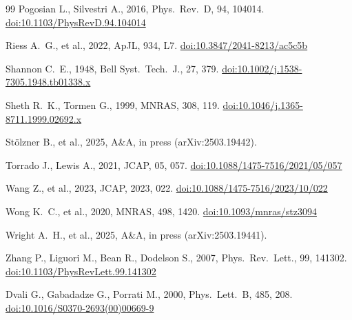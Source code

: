 \documentclass[12pt,a4paper]{article}
\newcommand{\doi}[1]{\href{https://doi.org/#1}{doi:#1}}
\begin{document}
\begin{thebibliography}{99}
Pogosian L., Silvestri A., 2016, Phys.\ Rev.\ D, 94, 104014.
\newblock \doi{10.1103/PhysRevD.94.104014}

Riess A.~G., et al., 2022, ApJL, 934, L7.
\newblock \doi{10.3847/2041-8213/ac5c5b}

Shannon C.~E., 1948, Bell Syst.\ Tech.\ J., 27, 379.
\newblock \doi{10.1002/j.1538-7305.1948.tb01338.x}

Sheth R.~K., Tormen G., 1999, MNRAS, 308, 119.
\newblock \doi{10.1046/j.1365-8711.1999.02692.x}

St\"olzner B., et al., 2025, A\&A, in press (arXiv:2503.19442).

Torrado J., Lewis A., 2021, JCAP, 05, 057.
\newblock \doi{10.1088/1475-7516/2021/05/057}

Wang Z., et al., 2023, JCAP, 2023, 022.
\newblock \doi{10.1088/1475-7516/2023/10/022}

Wong K.~C., et al., 2020, MNRAS, 498, 1420.
\newblock \doi{10.1093/mnras/stz3094}

Wright A.~H., et al., 2025, A\&A, in press (arXiv:2503.19441).

Zhang P., Liguori M., Bean R., Dodelson S., 2007, Phys.\ Rev.\ Lett., 99, 141302.
\newblock \doi{10.1103/PhysRevLett.99.141302}

Dvali G., Gabadadze G., Porrati M., 2000, Phys.\ Lett.\ B, 485, 208.
\newblock \doi{10.1016/S0370-2693(00)00669-9}

\end{thebibliography}
\end{document}
